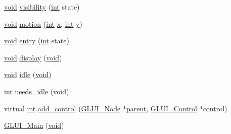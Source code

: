 \begin{DoxyCompactItemize}
\item 
\hyperlink{wglext_8h_a9e6b7f1933461ef318bb000d6bd13b83}{void} \hyperlink{class_g_l_u_i___main_a776f5d5aa6323af0c05992c83be90bbf}{visibility} (\hyperlink{wglext_8h_a500a82aecba06f4550f6849b8099ca21}{int} state)
\item 
\hyperlink{wglext_8h_a9e6b7f1933461ef318bb000d6bd13b83}{void} \hyperlink{class_g_l_u_i___main_a0e8746ccbea45d443007854ae3e07c53}{motion} (\hyperlink{wglext_8h_a500a82aecba06f4550f6849b8099ca21}{int} \hyperlink{glext_8h_ad77deca22f617d3f0e0eb786445689fc}{x}, \hyperlink{wglext_8h_a500a82aecba06f4550f6849b8099ca21}{int} \hyperlink{glext_8h_a9298c7ad619074f5285b32c6b72bfdea}{y})
\item 
\hyperlink{wglext_8h_a9e6b7f1933461ef318bb000d6bd13b83}{void} \hyperlink{class_g_l_u_i___main_a5e7e1594748809fb14ac86f3d15fc5a0}{entry} (\hyperlink{wglext_8h_a500a82aecba06f4550f6849b8099ca21}{int} state)
\item 
\hyperlink{wglext_8h_a9e6b7f1933461ef318bb000d6bd13b83}{void} \hyperlink{class_g_l_u_i___main_af8867df3fa133efbf11064da84a8c047}{display} (\hyperlink{wglext_8h_a9e6b7f1933461ef318bb000d6bd13b83}{void})
\item 
\hyperlink{wglext_8h_a9e6b7f1933461ef318bb000d6bd13b83}{void} \hyperlink{class_g_l_u_i___main_a0f172148e78cde1d8e25e989ba90d43d}{idle} (\hyperlink{wglext_8h_a9e6b7f1933461ef318bb000d6bd13b83}{void})
\item 
\hyperlink{wglext_8h_a500a82aecba06f4550f6849b8099ca21}{int} \hyperlink{class_g_l_u_i___main_aef95c5469e82e69335293fecbebdd3ab}{needs\+\_\+idle} (\hyperlink{wglext_8h_a9e6b7f1933461ef318bb000d6bd13b83}{void})
\item 
virtual \hyperlink{wglext_8h_a500a82aecba06f4550f6849b8099ca21}{int} \hyperlink{class_g_l_u_i___main_aa18b473f6cf75095c12c4edecaf856a3}{add\+\_\+control} (\hyperlink{class_g_l_u_i___node}{G\+L\+U\+I\+\_\+\+Node} $\ast$\hyperlink{class_g_l_u_i___node_a8ed65d447784f6f88bd3e2e2bcac6cdb}{parent}, \hyperlink{class_g_l_u_i___control}{G\+L\+U\+I\+\_\+\+Control} $\ast$control)
\item 
\hyperlink{class_g_l_u_i___main_af27588439ff8203ef8e8059cf0c58e6c}{G\+L\+U\+I\+\_\+\+Main} (\hyperlink{wglext_8h_a9e6b7f1933461ef318bb000d6bd13b83}{void})
\end{DoxyCompactItemize}
